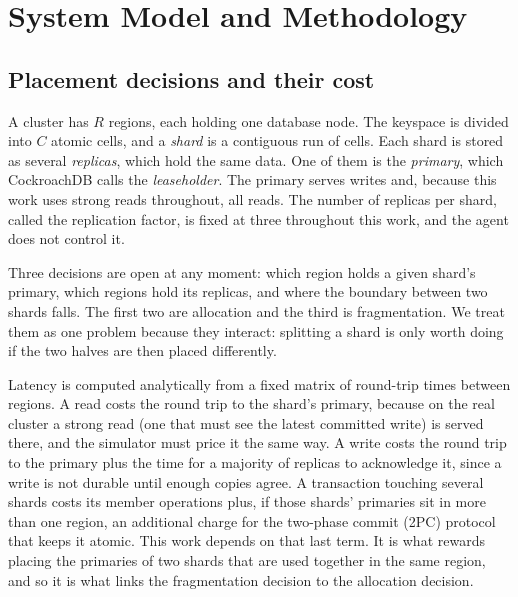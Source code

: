 %

\section{System Model and Methodology}\label{sec:model}

\subsection{Placement decisions and their cost}

A cluster has $R$ regions, each holding one database node. The keyspace is
divided into $C$ atomic cells, and a \emph{shard} is a contiguous run of cells.
Each shard is stored as several \emph{replicas}, which hold the same data. One of them is the \emph{primary}, which CockroachDB calls the \emph{leaseholder}. The primary serves writes and, because this work uses strong reads throughout, all reads. The number of replicas per shard, called the replication factor, is fixed at three throughout this work, and the agent does not control it.

Three decisions are open at any moment: which region holds a
given shard's primary, which regions hold its replicas, and where the boundary
between two shards falls. The first two are allocation and the third is
fragmentation. We treat them as one problem because they interact:
splitting a shard is only worth doing if the two halves are then placed
differently.

Latency is computed analytically from a fixed matrix of round-trip times
between regions. A read costs the round trip to the shard's primary, because on the real cluster a strong read (one that must see the latest committed write) is served there, and the simulator must price it the same way. A write costs
the round trip to the primary plus the time for a majority of replicas to
acknowledge it, since a write is not durable until enough copies agree. A
transaction touching several shards costs its member operations plus, if those
shards' primaries sit in more than one region, an additional charge for the
two-phase commit (2PC) protocol that keeps it atomic. This work depends on
that last term. It is what rewards placing the primaries
of two shards that are used together in the same region, and so it is what
links the fragmentation decision to the allocation decision.

